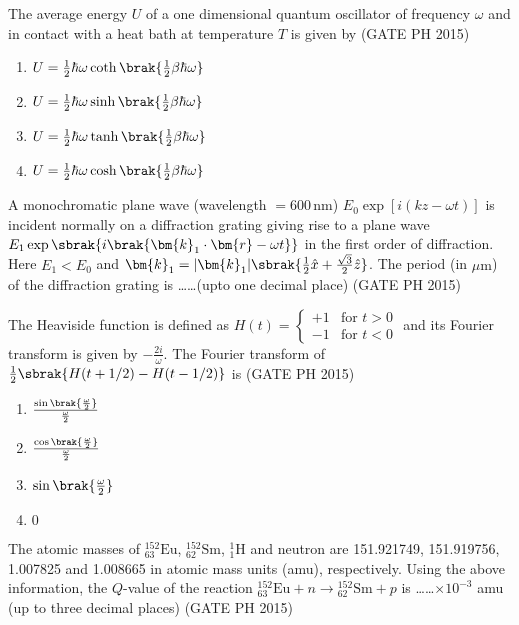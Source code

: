 \item The average energy $U$ of a one dimensional quantum oscillator of frequency $\omega$ and in contact with a heat bath at temperature $T$ is given by \hfill (GATE PH 2015)

\begin{multicols}{2}
    \begin{enumerate}
        \item $U = \frac{1}{2} \hbar \omega \coth \brak{ \frac{1}{2} \beta \hbar \omega }$
        \item $U = \frac{1}{2} \hbar \omega \sinh \brak{ \frac{1}{2} \beta \hbar \omega }$
        \item $U = \frac{1}{2} \hbar \omega \tanh \brak{ \frac{1}{2} \beta \hbar \omega }$
        \item $U = \frac{1}{2} \hbar \omega \cosh \brak{ \frac{1}{2} \beta \hbar \omega }$
    \end{enumerate}
\end{multicols}

\item  A monochromatic plane wave (wavelength $= 600 \, \text{nm}$) $E_0 \exp[i(kz - \omega t)]$ is incident normally on a diffraction grating giving rise to a plane wave $E_1 \exp \sbrak{ i \brak{ \bm{k}_1 \cdot \bm{r} - \omega t } }$ in the first order of diffraction. Here $E_1 < E_0$ and $\bm{k}_1 = \lvert \bm{k}_1 \rvert \sbrak{ \frac{1}{2} \hat{x} + \frac{\sqrt{3}}{2} \hat{z} }$. The period (in $\mu \text{m}$) of the diffraction grating is \ldots\ldots (upto one decimal place) \hfill (GATE PH 2015)

\item The Heaviside function is defined as 
$ H(t) = \begin{cases} 
    +1 & \text{for } t > 0 \\
    -1 & \text{for } t < 0 
\end{cases}$
and its Fourier transform is given by $-\frac{2i}{\omega}$. The Fourier transform of $\frac{1}{2} \sbrak{ H(t + 1/2) - H(t - 1/2) }$ is \hfill (GATE PH 2015)

\begin{multicols}{4}
    \begin{enumerate}
        \item $\frac{\sin \brak{ \frac{\omega}{2} }}{\frac{\omega}{2}}$
        \item $\frac{\cos \brak{ \frac{\omega}{2} }}{\frac{\omega}{2}}$
        \item $\sin \brak{ \frac{\omega}{2} }$
        \item $0$
    \end{enumerate}
\end{multicols}

\item The atomic masses of ${}^{152}_{63}\text{Eu}$, ${}^{152}_{62}\text{Sm}$, ${}^{1}_{1}\text{H}$ and neutron are 151.921749, 151.919756, 1.007825 and 1.008665 in atomic mass units (amu), respectively. Using the above information, the $Q$-value of the reaction ${}^{152}_{63}\text{Eu} + n \rightarrow {}^{152}_{62}\text{Sm} + p$ is \ldots\ldots $\times 10^{-3}$ amu (up to three decimal places) \hfill (GATE PH 2015)
